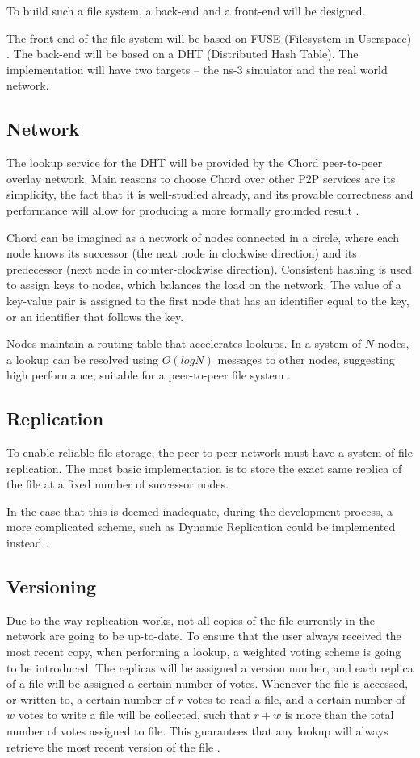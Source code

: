 \documentclass[8pt,a4paper]{article}
\begin{document}
To build such a file system, a back-end and a front-end will be designed.

The front-end of the file system will be based on FUSE (Filesystem in Userspace) \cite{fuse}.
The back-end will be based on a DHT (Distributed Hash Table). 
The implementation will have two targets -- the ns-3 \cite{ns3} simulator and the real world network.

\subsection{Network}
The lookup service for the DHT will be provided by the Chord peer-to-peer overlay network. Main reasons to choose Chord over other P2P services are its simplicity, the fact that it is well-studied already, and its provable correctness and performance will allow for producing a more formally grounded result \cite{chord}. %

Chord can be imagined as a network of nodes connected in a circle, where each node knows its successor (the next node in clockwise direction) and its predecessor (next node in counter-clockwise direction). Consistent hashing is used to assign keys to nodes, which balances the load on the network. The value of a key-value pair is assigned to the first node that has an identifier equal to the key, or an identifier that follows the key. 

Nodes maintain a routing table that accelerates lookups. In a system of $N$ nodes, a lookup can be resolved using $O(log N)$ messages to other nodes, suggesting high performance, suitable for a peer-to-peer file system \cite{chord}.

\subsection{Replication}
To enable reliable file storage, the peer-to-peer network must have a system of file replication. The most basic implementation is to store the exact same replica of the file at a fixed number of successor nodes. 

In the case that this is deemed inadequate, during the development process, a more complicated scheme, such as Dynamic Replication could be implemented instead \cite{dhash}.

\subsection{Versioning}
Due to the way replication works, not all copies of the file currently in the network are going to be up-to-date. To ensure that the user always received the most recent copy, when performing a lookup, a weighted voting scheme is going to be introduced. The replicas will be assigned a version number, and each replica of a file will be assigned a certain number of votes. Whenever the file is accessed, or written to, a certain number of $r$ votes to read a file, and a certain number of $w$ votes to write a file will be collected, such that $r + w$ is more than the total number of votes assigned to file. This guarantees that any lookup will always retrieve the most recent version of the file \cite{versioning}.
\end{document}
